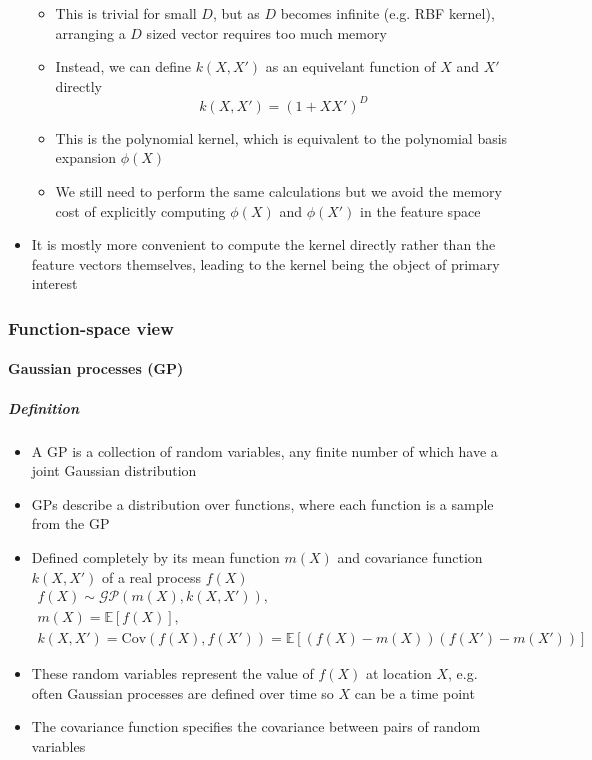\documentclass[12pt]{article}
\begin{document}
\begin{itemize}
\begin{itemize}
        \item This is trivial for small $D$, but as $D$ becomes infinite (e.g. RBF kernel), arranging a $D$ sized vector requires too much memory
        \item Instead, we can define $k(X,X')$ as an equivelant function of $X$ and $X'$ directly
\begin{equation}
    k(X,X') = (1 + XX')^D
\end{equation}
        \item This is the polynomial kernel, which is equivalent to the polynomial basis expansion $\phi(X)$
        \item We still need to perform the same calculations but we avoid the memory cost of explicitly computing $\phi(X)$ and $\phi(X')$ in the feature space
    \end{itemize}
    \item It is mostly more convenient to compute the kernel directly rather than the feature vectors themselves, leading to the kernel being the object of primary interest
\end{itemize}



\subsubsection{Function-space view}


\paragraph{Gaussian processes (GP)}

\subparagraph{Definition}
\begin{itemize}
    \item A GP is a collection of random variables, any finite number of which have a joint Gaussian distribution
    \item GPs describe a distribution over functions, where each function is a sample from the GP
    \item Defined completely by its mean function $m(X)$ and covariance function $k(X,X')$ of a real process $f(X)$
\begin{equation}
    \begin{aligned}
        f(X) \sim \mathcal{GP}(m(X), k(X,X')), \\
        m(X) = \mathbb{E}[f(X)], \\
        k(X,X') = \text{Cov}(f(X), f(X')) = \mathbb{E}[(f(X) - m(X))(f(X') - m(X'))]
    \end{aligned}
\end{equation}
    \item These random variables represent the value of $f(X)$ at location $X$, e.g. often Gaussian processes are defined over time so $X$ can be a time point
    \item The covariance function specifies the covariance between pairs of random variables
\end{itemize}
\end{document}

